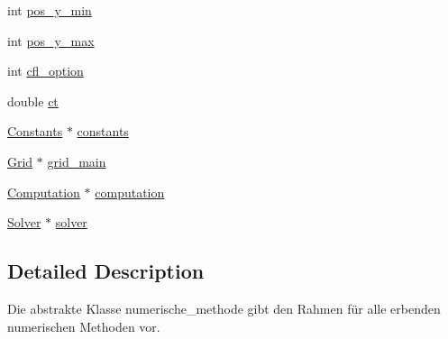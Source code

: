 \begin{DoxyCompactItemize}
int \hyperlink{classNumerical__Method_a4d01637ef8b385ce84838349e944077a}{pos\-\_\-y\-\_\-min}
\item 
int \hyperlink{classNumerical__Method_acb20f8b0ee0e8ef5e18f8c02037bc4cb}{pos\-\_\-y\-\_\-max}
\item 
int \hyperlink{classNumerical__Method_a3a886e522a1cba5cfc5fcf3023bef720}{cfl\-\_\-option}
\item 
double \hyperlink{classNumerical__Method_a6218be59c261f1fc6ed8f68141f4db71}{ct}
\item 
\hyperlink{classConstants}{Constants} $\ast$ \hyperlink{classNumerical__Method_a63a7ffa9eb0ab132ae008aa4d1e0dfc6}{constants}
\item 
\hyperlink{classGrid}{Grid} $\ast$ \hyperlink{classNumerical__Method_a78f90e67fce4934dfd2b7473d3f4c896}{grid\-\_\-main}
\item 
\hyperlink{classComputation}{Computation} $\ast$ \hyperlink{classNumerical__Method_aec80d2974afbd7ed72f7b7592b0f7595}{computation}
\item 
\hyperlink{classSolver}{Solver} $\ast$ \hyperlink{classNumerical__Method_ace474723e7f6407dea6b099a0f5d82f6}{solver}
\end{DoxyCompactItemize}


\subsection{Detailed Description}
Die abstrakte Klasse numerische\-\_\-methode gibt den Rahmen für alle erbenden numerischen Methoden vor. 


